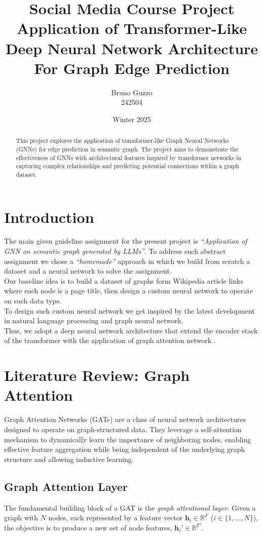 \documentclass[11pt]{article}
\title{Social Media Course Project \\ [1em] \Large Application of Transformer-Like Deep Neural Network Architecture For Graph Edge Prediction}
\author{Bruno Guzzo \\ 242504}
\date{Winter 2025}
\begin{document}
	
	\maketitle
	
	\begin{abstract}
	This project explores the application of transformer-like Graph Neural Networks (GNNs) for edge prediction in semantic graph. The project aims to demonstrate the effectiveness of GNNs with architectural features inspired by transformer networks in capturing complex relationships and predicting potential connections within a graph dataset.
	\end{abstract}
	
	
	\section{Introduction}
	The main given guideline assignment for the present project is \textit{``Application of GNN on semantic graph generated by LLMs''}. To address such abstract assignment we chose a \textit{``homemade''} approach in which we build from scratch a dataset and a neural network to solve the assignment. \\
	Our baseline idea is to build a dataset of graphs form Wikipedia article links where each node is a page title, then design a custom neural network to operate on such data type.\\
	To design such custom neural network we get inspired by the latest development in natural language processing and graph neural network. \\
	Thus, we adopt a deep neural network architecture that extend the encoder stack of the transformer \cite{vaswani2023attentionneed} with the application of graph attention network \cite{veličković2018graphattentionnetworks}.
	
	
	\section{Literature Review: Graph Attention}
	\label{graph_attention}
	Graph Attention Networks (GATs) are a class of neural network architectures designed to operate on graph-structured data. They leverage a self-attention mechanism \cite{vaswani2023attentionneed} to dynamically learn the importance of neighboring nodes, enabling effective feature aggregation while being independent of the underlying graph structure and allowing inductive learning.
	
	\subsection{Graph Attention Layer}
	The fundamental building block of a GAT \cite{veličković2018graphattentionnetworks} is the \textit{graph attentional layer}. Given a graph with $N$ nodes, each represented by a feature vector $\mathbf{h}_i \in \mathbb{R}^F$ ($i \in \{1, \dots, N\}$), the objective is to produce a new set of node features, $\mathbf{h}_i' \in \mathbb{R}^{F'}$.
	
\end{document}
